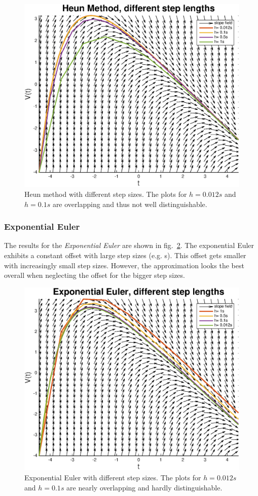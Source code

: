 \documentclass[
a4paper, 
12pt, 
]{article}
\begin{document}
	\begin{figure}[h]
		\centering
		\includegraphics[width=0.85\linewidth]{Plots/HeunMethod}
		\caption{Heun method with different step sizes. The plots for $h = 0.012s$ and $h = 0.1s$ are overlapping and thus not well distinguishable. }
		\label{fig:HeunMethod}
	\end{figure}
	
		
	
	\clearpage
	\subsubsection{Exponential Euler}
	The results for the \emph{Exponential Euler} are shown in fig.~\ref{fig:ExpEuler}. The exponential Euler exhibits a constant offset with large step sizes (e.g. s). This offset gets smaller with increasingly small step sizes. However, the approximation looks the best overall when neglecting the offset for the bigger step sizes. 

	\begin{figure}[h]
		\centering
		\includegraphics[width=0.85\linewidth]{Plots/ExpEuler}
		\caption{Exponential Euler with different step sizes. The plots for $h = 0.012s$ and $h = 0.1s$ are nearly overlapping and hardly distinguishable. }
		\label{fig:ExpEuler}
	\end{figure}
	
\end{document}
